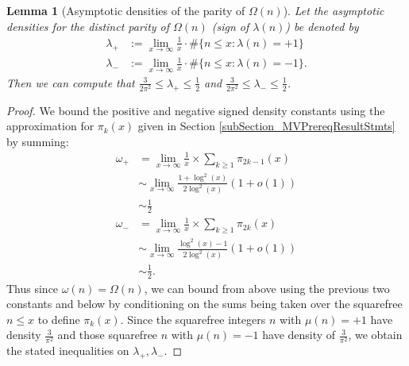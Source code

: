 \documentclass[11pt,reqno,a4letter]{article}
\numberwithin{figure}{section}
\numberwithin{table}{section}
\theoremstyle{plain}
\newtheorem{lemma}[theorem]{Lemma}
\numberwithin{theorem}{section}
\theoremstyle{definition}
\begin{document}
\begin{lemma}[Asymptotic densities of the parity of $\Omega(n)$] 
\label{lemma_AsymptoticDensitiesParityOmegan_v1} 
Let the asymptotic densities for the distinct parity of $\Omega(n)$ (sign of $\lambda(n)$) 
be denoted by 
\begin{align*} 
\lambda_{+} & := \lim_{x \rightarrow \infty} \frac{1}{x} \cdot \#\{n \leq x: \lambda(n) = +1\} \\ 
\lambda_{-} & := \lim_{x \rightarrow \infty} \frac{1}{x} \cdot \#\{n \leq x: \lambda(n) = -1\}. 
\end{align*} 
Then we can compute that $\frac{3}{2\pi^2} \leq \lambda_{+} \leq \frac{1}{2}$ and 
$\frac{3}{2\pi^2} \leq \lambda_{-} \leq \frac{1}{2}$. 
\end{lemma} 
\begin{proof} 
We bound the positive and negative signed density constants using the approximation for $\pi_k(x)$ given in 
Section \ref{subSection_MVPrereqResultStmts} by summing: 
\begin{align*} 
\omega_{+} & = \lim_{x \rightarrow \infty} \frac{1}{x} \times \sum_{k \geq 1} \pi_{2k-1}(x) \\ 
     & \sim \lim_{x \rightarrow \infty} \frac{1+\log^2(x)}{2 \log^2(x)} (1+o(1)) \\ 
     & \sim \frac{1}{2} \\ 
\omega_{-} & = \lim_{x \rightarrow \infty} \frac{1}{x} \times \sum_{k \geq 1} \pi_{2k}(x) \\ 
     & \sim \lim_{x \rightarrow \infty} \frac{\log^2(x)-1}{2 \log^2(x)} (1+o(1)) \\ 
     & \sim \frac{1}{2}. 
\end{align*} 
Thus since $\omega(n) = \Omega(n)$, we can bound from above using the previous two constants and below 
by conditioning on the sums being taken over the squarefree $n \leq x$ to define $\pi_k(x)$. 
Since the squarefree integers $n$ with $\mu(n) = +1$ have density $\frac{3}{\pi^2}$ and those squarefree $n$ 
with $\mu(n) = -1$ have density of $\frac{3}{\pi^2}$, we obtain the stated inequalities on 
$\lambda_{+}, \lambda_{-}$. 
\end{proof} 
\end{document}
